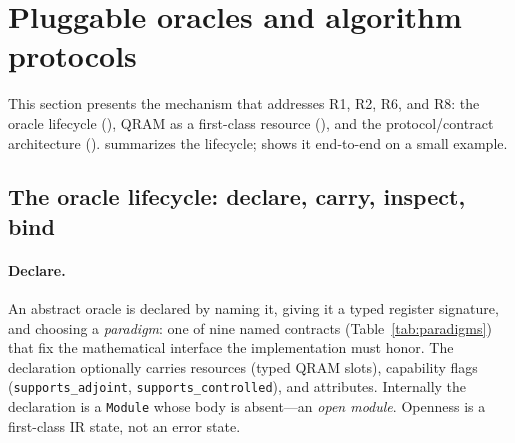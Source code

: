 \section{Pluggable oracles and algorithm protocols}
\label{sec:oracles}

This section presents the mechanism that addresses R1, R2, R6, and R8: the
oracle lifecycle (), QRAM as a first-class
resource (), and the protocol/contract architecture
().   summarizes the
lifecycle;  shows it end-to-end on a small example.

\subsection{The oracle lifecycle: declare, carry, inspect, bind}
\label{sec:oracle-lifecycle}

\paragraph{Declare.}
An abstract oracle is declared by naming it, giving it a typed register
signature, and choosing a \emph{paradigm}: one of nine named contracts
(Table~\ref{tab:paradigms}) that fix the mathematical interface the
implementation must honor.  The declaration optionally carries resources
(typed QRAM slots), capability flags (\texttt{supports\_adjoint},
\texttt{supports\_controlled}), and attributes.  Internally the declaration
is a \texttt{Module} whose body is absent---an \emph{open module}.  Openness
is a first-class IR state, not an error state.

